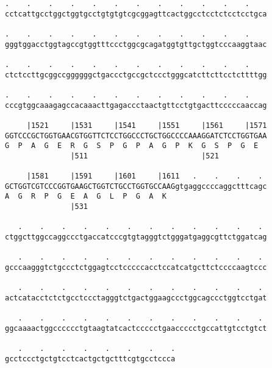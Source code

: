 \documentclass{article}
\begin{document}
\begin{Verbatim}
.    .    .    .    .    .    .    .    .    .    .    .    
cctcattgcctggctggtgcctgtgtgtcgcggagttcactggcctcctctcctcctgca
                                                            
.    .    .    .    .    .    .    .    .    .    .    .    
gggtggacctggtagccgtggtttccctggcgcagatggtgttgctggtcccaaggtaac
                                                            
.    .    .    .    .    .    .    .    .    .    .    .    
ctctccttgcggccggggggctgaccctgccgctccctgggcatcttcttcctcttttgg
                                                            
.    .    .    .    .    .    .    .    .    .    .    .    
cccgtggcaaagagccacaaacttgagaccctaactgttcctgtgacttcccccaaccag
                                                            
     |1521     |1531     |1541     |1551     |1561     |1571
GGTCCCGCTGGTGAACGTGGTTCTCCTGGCCCTGCTGGCCCCAAAGGATCTCCTGGTGAA
G  P  A  G  E  R  G  S  P  G  P  A  G  P  K  G  S  P  G  E  
               |511                          |521           
  
     |1581     |1591     |1601     |1611   .    .    .    . 
GCTGGTCGTCCCGGTGAAGCTGGTCTGCCTGGTGCCAAGgtgaggccccaggctttcagc
A  G  R  P  G  E  A  G  L  P  G  A  K                       
               |531                                         
  
   .    .    .    .    .    .    .    .    .    .    .    . 
ctggcttggccaggccctgaccatcccgtgtagggtctgggatgaggcgttctggatcag
                                                            
   .    .    .    .    .    .    .    .    .    .    .    . 
gcccaagggtctgccctctggagtcctcccccacctccatcatgcttctccccaagtccc
                                                            
   .    .    .    .    .    .    .    .    .    .    .    . 
actcatacctctctgcctccctagggtctgactggaagccctggcagccctggtcctgat
                                                            
   .    .    .    .    .    .    .    .    .    .    .    . 
ggcaaaactggcccccctgtaagtatcactccccctgaaccccctgccattgtcctgtct
                                                            
   .    .    .    .    .    .    .    .
gcctccctgctgtcctcactgctgctttcgtgcctccca
                                       
                                       
 

\end{Verbatim}
\end{document}
